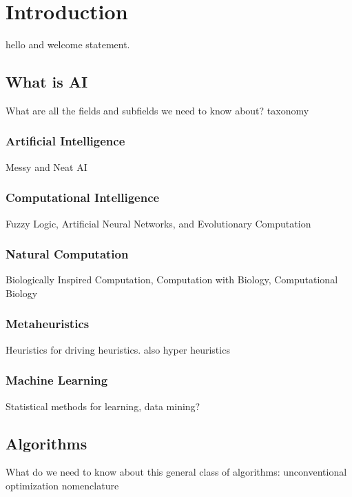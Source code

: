 


\chapter{Introduction}
\label{chap:intro}

hello and welcome statement.

% 
% 
\section{What is AI}
\label{intro:sec:what_is_ai}
What are all the fields and subfields we need to know about? 
taxonomy

\subsection{Artificial Intelligence}
Messy and Neat AI

\subsection{Computational Intelligence}
Fuzzy Logic, Artificial Neural Networks, and Evolutionary Computation

\subsection{Natural Computation}
Biologically Inspired Computation, Computation with Biology, Computational Biology 

\subsection{Metaheuristics}
Heuristics for driving heuristics. also hyper heuristics

\subsection{Machine Learning}
Statistical methods for learning, data mining?

% 
% 
\section{Algorithms}
\label{intro:sec:algorithms}
What do we need to know about this general class of algorithms: unconventional optimization
nomenclature

